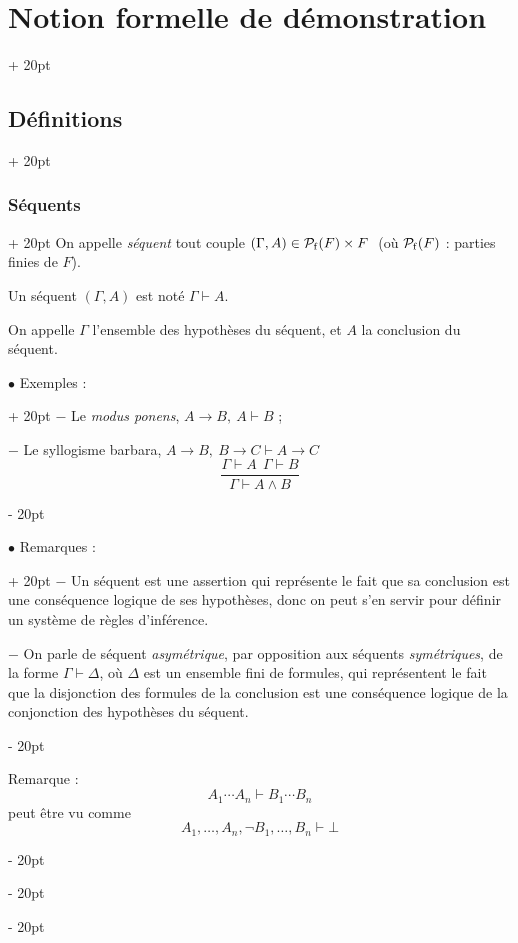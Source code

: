 \documentclass[a4paper, 12pt, twoside]{article}
\newcommand{\ind}[1][20pt]{\advance\leftskip + #1}
\newcommand{\deind}[1][20pt]{\advance\leftskip - #1}
\newenvironment{indt}[2][20pt]{#2 \par \ind[#1]}{\par \deind} %
\begin{document}
\begin{indt}{\section{Notion formelle de démonstration}}
\begin{indt}{\subsection{Définitions}}
\begin{indt}{\subsubsection{Séquents}}
                On appelle \emph{séquent} tout couple $(\Gamma, A) \in \mathcal P_{\rm f}(F) \times F\ $ (où $\mathcal P_{\rm f}(F)$ : parties finies de $F$).

                Un séquent $(\Gamma, A)$ est noté $\Gamma \vdash A$.

                On appelle $\Gamma$ l'ensemble des hypothèses du séquent, et $A$ la conclusion du séquent.

                \vspace{12pt}
                
                \begin{indt}{$\bullet$ Exemples :}
                    $-$ Le \textit{modus ponens}, $A \rightarrow B,\ A \vdash B$ ;

                    $-$ Le syllogisme barbara, $A \rightarrow B,\ B \rightarrow C \vdash A \rightarrow C$
                    \[
                        \dfrac{\Gamma \vdash A\ \ \Gamma \vdash B}{\Gamma \vdash A \wedge B}
                    \]
                \end{indt}

                \vspace{12pt}
                
                \begin{indt}{$\bullet$ Remarques :}
                    $-$ Un séquent est une assertion qui représente le fait que sa conclusion est une conséquence logique de ses hypothèses, donc on peut s'en servir pour définir un système de règles d'inférence.

                    \vspace{6pt}
                    
                    $-$ On parle de séquent \emph{asymétrique}, par opposition aux séquents \emph{symétriques}, de la forme $\Gamma \vdash \Delta$, où $\Delta$ est un ensemble fini de formules, qui représentent le fait que la disjonction des formules de la conclusion est une conséquence logique de la conjonction des hypothèses du séquent.
                \end{indt}

                \vspace{12pt}
                
                Remarque :
                \[
                    A_1 \cdots A_n \vdash B_1 \cdots B_n
                \]
                peut être vu comme
                \[
                    A_1, \ldots, A_n, \neg B_1, \ldots, B_n \vdash \bot
                \]


\end{indt}
\end{indt}
\end{indt}
\end{document}
